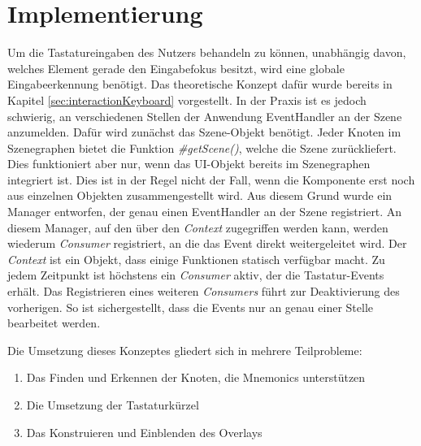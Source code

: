\section{Implementierung} \label{sec:interactionImplementation}
Um die Tastatureingaben des Nutzers behandeln zu können, unabhängig davon, welches Element gerade den Eingabefokus besitzt, wird eine globale Eingabeerkennung benötigt. Das theoretische Konzept dafür wurde bereits in Kapitel \ref{sec:interactionKeyboard} vorgestellt. In der Praxis ist es jedoch schwierig, an verschiedenen Stellen der Anwendung EventHandler an der Szene anzumelden. Dafür wird zunächst das Szene-Objekt benötigt. Jeder Knoten im Szenegraphen bietet die Funktion \textit{\#{}getScene()}, welche die Szene zurückliefert. Dies funktioniert aber nur, wenn das UI-Objekt bereits im Szenegraphen integriert ist. Dies ist in der Regel nicht der Fall, wenn die Komponente erst noch aus einzelnen Objekten zusammengestellt wird. Aus diesem Grund wurde ein Manager entworfen, der genau einen EventHandler an der Szene registriert. An diesem Manager, auf den über den \textit{Context} zugegriffen werden kann, werden wiederum \textit{Consumer} registriert, an die das Event direkt weitergeleitet wird. Der \textit{Context} ist ein Objekt, dass einige Funktionen statisch verfügbar macht. Zu jedem Zeitpunkt ist höchstens ein \textit{Consumer} aktiv, der die Tastatur-Events erhält. Das Registrieren eines weiteren \textit{Consumers} führt zur Deaktivierung des vorherigen. So ist sichergestellt, dass die Events nur an genau einer Stelle bearbeitet werden.\par
{}
Die Umsetzung dieses Konzeptes gliedert sich in mehrere Teilprobleme:
\begin{enumerate}
 \item Das Finden und Erkennen der Knoten, die Mnemonics unterstützen
 \item Die Umsetzung der Tastaturkürzel
 \item Das Konstruieren und Einblenden des Overlays
\end{enumerate}
